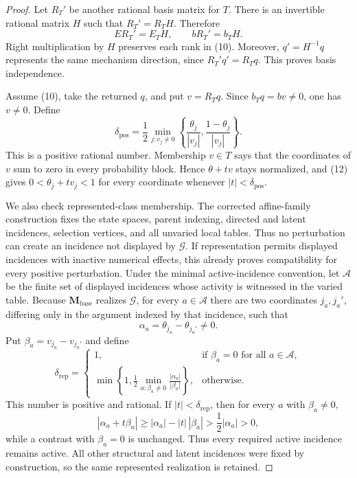 \documentclass{article}
\begin{document}
\begin{proof}
Let \(R_T'\) be another rational basis matrix for \(T\).  There is an invertible rational matrix \(H\) such that \(R_T'=R_TH\).  Therefore
\[
 ER_T'=E_TH,\qquad bR_T'=b_TH.                                  \tag{11}
\]
Right multiplication by \(H\) preserves each rank in (10).  Moreover, \(q'=H^{-1}q\) represents the same mechanism direction, since \(R_T'q'=R_Tq\).  This proves basis independence.

Assume (10), take the returned \(q\), and put \(v=R_Tq\).  Since \(b_Tq=bv\ne0\), one has \(v\ne0\).  Define
\[
 \delta_{\mathrm{pos}}
 =\frac12\min_{j:v_j\ne0}
 \left\{\frac{\theta_j}{|v_j|},
              \frac{1-\theta_j}{|v_j|}\right\}.               \tag{12}
\]
This is a positive rational number.  Membership \(v\in T\) says that the coordinates of \(v\) sum to zero in every probability block.  Hence \(\theta+t v\) stays normalized, and (12) gives \(0<\theta_j+t v_j<1\) for every coordinate whenever \(|t|<\delta_{\mathrm{pos}}\).

We also check represented-class membership.  The corrected affine-family construction fixes the state spaces, parent indexing, directed and latent incidences, selection vertices, and all unvaried local tables.  Thus no perturbation can create an incidence not displayed by \(\mathcal G\).  If representation permits displayed incidences with inactive numerical effects, this already proves compatibility for every positive perturbation.  Under the minimal active-incidence convention, let \(\mathcal A\) be the finite set of displayed incidences whose activity is witnessed in the varied table.  Because \(\mathbf M_{\mathrm{base}}\) realizes \(\mathcal G\), for every \(a\in\mathcal A\) there are two coordinates \(j_a,j_a'\), differing only in the argument indexed by that incidence, such that
\[
 \alpha_a=\theta_{j_a}-\theta_{j_a'}\ne0.                     \tag{13}
\]
Put \(\beta_a=v_{j_a}-v_{j_a'}\) and define
\[
 \delta_{\mathrm{rep}}
 =\begin{cases}
 1,&\text{if }\beta_a=0\text{ for all }a\in\mathcal A,\\[1mm]
 \displaystyle\min\!\left\{1,
   \frac12\min_{a:\beta_a\ne0}\frac{|\alpha_a|}{|\beta_a|}\right\},
 &\text{otherwise}.
 \end{cases}                                                    \tag{14}
\]
This number is positive and rational.  If \(|t|<\delta_{\mathrm{rep}}\), then for every \(a\) with \(\beta_a\ne0\),
\[
 |\alpha_a+t\beta_a|
 \ge |\alpha_a|-|t|\,|\beta_a|
 >\frac12|\alpha_a|>0,                                        \tag{15}
\]
while a contrast with \(\beta_a=0\) is unchanged.  Thus every required active incidence remains active.  All other structural and latent incidences were fixed by construction, so the same represented realization is retained.


\end{proof}
\end{document}
